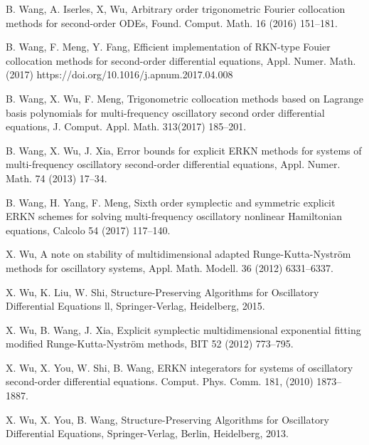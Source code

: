 \documentclass{article}
\begin{document}
\begin{thebibliography}{99}
B. Wang, A. Iserles, X, Wu, Arbitrary order trigonometric Fourier
collocation methods for second-order ODEs, Found. Comput. Math. 16
(2016) 151--181.


B. Wang, F. Meng, Y. Fang, Efficient implementation of RKN-type
Fouier collocation methods for second-order differential equations,
 Appl. Numer. Math. (2017) https://doi.org/10.1016/j.apnum.2017.04.008

B. Wang, X. Wu, F. Meng, Trigonometric collocation methods based on
Lagrange basis polynomials for multi-frequency oscillatory second
order differential equations, J. Comput. Appl. Math. 313(2017)
185--201.

 B. Wang, X. Wu,  J. Xia,  Error bounds for explicit ERKN methods for systems of multi-frequency oscillatory second-order
differential equations,  Appl. Numer. Math.
 74 (2013) 17--34.

B. Wang, H. Yang, F. Meng, Sixth order symplectic and symmetric
explicit ERKN schemes for solving multi-frequency oscillatory
nonlinear Hamiltonian equations, Calcolo 54 (2017) 117--140.

 X. Wu,
  A note on stability of multidimensional
adapted Runge-Kutta-Nystr\"{o}m methods for oscillatory systems,
Appl. Math. Modell.    36 (2012)   6331--6337.

X. Wu, K. Liu, W. Shi, Structure-Preserving Algorithms for
Oscillatory Differential Equations ll, Springer-Verlag, Heidelberg,
2015.

X. Wu,  B. Wang, J. Xia,
 Explicit symplectic
multidimensional exponential fitting modified
Runge-Kutta-Nystr\"{o}m methods, BIT  52 (2012) 773--795.

X. Wu, X. You, W. Shi, B. Wang, ERKN integerators for systems of
oscillatory second-order differential equations. Comput. Phys. Comm.
181, (2010) 1873--1887.

  X. Wu, X. You, B. Wang,  Structure-Preserving Algorithms for Oscillatory
Differential Equations, Springer-Verlag, Berlin, Heidelberg, 2013.


\end{thebibliography}
\end{document}
